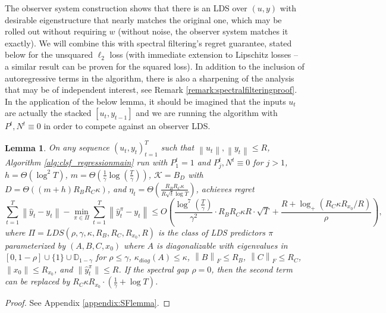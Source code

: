 \documentclass[11pt]{article}
\newcommand{\eh}[1]{$\ll$\textsf{\color{blue} EH : #1}$\gg$}
\newcommand{\evannote}[1]{\textcolor{red}{\{evan: #1\}}}
\newcommand{\norm}[1]{\left\lVert#1\right\rVert}
\newtheorem{lemma}[theorem]{Lemma}
\numberwithin{equation}{section}
\begin{document}
The observer system construction shows that there is an LDS over $(u, y)$ with desirable eigenstructure that nearly matches the original one, which may be rolled out without requiring $w$ (without noise, the observer system matches it exactly). We will combine this with spectral filtering's regret guarantee, stated below for the unsquared $\ell_2$ loss (with immediate extension to Lipschitz losses -- a similar result can be proven for the squared loss). In addition to the inclusion of autoregressive terms in the algorithm, there is also a sharpening of the analysis that may be of independent interest, see Remark \ref{remark:spectralfilteringproof}. In the application of the below lemma, it should be imagined that the inputs $u_t$ are actually the stacked $[u_t, y_{t-1}]$ and we are running the algorithm with $P^t,N^t \equiv 0$ in order to compete against an observer LDS.

\begin{lemma} 
\label{lemma:spectralfiltering}
    On any sequence $(u_t, y_t)_{t=1}^T$ such that $\norm{u_t}, \norm{y_t} \leq R$, Algorithm \ref{alg:clsf_regressionmain} run with $P^t_1 = 1$ and $P^t_j, N^t \equiv 0$ for $j > 1$, $h = \Theta (\log^2 T)$, $m = \Theta\left(\frac{1}{\gamma}\log\left(\frac{T}{\gamma}\right)\right)$, $\mathcal{K} = B_{D}$ with $D = \Theta((m+h)R_BR_C\kappa)$, and $\eta_t = \Theta\left(\frac{R_BR_C\kappa}{R\sqrt{t}\log T }\right)$, achieves regret
    \[
    \sum_{t=1}^T \norm{\hat{y}_t - y_t} - \min_{\pi \in \Pi}\sum_{t=1}^T\norm{{\hat{y}_t^\pi} - y_t} \leq O\left(\frac{\log^7\left(\frac{T}{\gamma}\right)}{\gamma^2} \cdot R_B R_C \kappa R \cdot \sqrt{T} + \frac{R + \log_+(R_C \kappa R_{x_0}/R)}{\rho}\right),
    \]
    where $\Pi=LDS(\rho, \gamma, \kappa, R_{B}, R_C, R_{x_0}, R)$ is the class of LDS predictors $\pi$ parameterized by $(A, B, C, x_0)$ where $A$ is diagonalizable with eigenvalues in $[0, 1-\rho] \cup \{1\} \cup \mathbb{D}_{1-\gamma}$ for $\rho \leq \gamma$, $\kappa_{diag}(A) \leq \kappa$, $\norm{B}_F \leq R_B$, $\norm{C}_F \leq R_C$, $\|x_0\| \leq R_{x_0}$, and $\|\hat{y}_t^\pi\| \leq R$. 
    If the spectral gap $\rho = 0$, then the second term can be replaced by $R_C \kappa R_{x_0} \cdot \left(\frac{1}{\gamma} + \log T\right)$.
\end{lemma}
\begin{proof}
See Appendix \ref{appendix:SFlemma}.
\end{proof}

\end{document}

